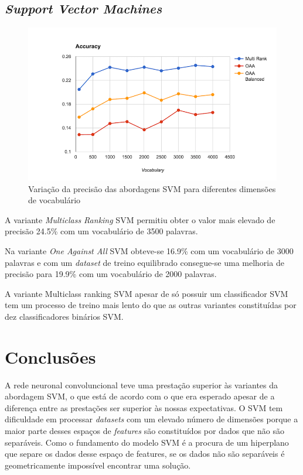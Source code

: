 \documentclass[extendedabs]{vcom}
\begin{document}
\subsection{\textit{Support Vector Machines}}

\begin{figure}[h]
\includegraphics[width=\linewidth]{images/svn_graph.png}
\caption{Variação da precisão das abordagens SVM para diferentes dimensões de vocabulário}
\label{fig:graph1}
\end{figure}

A variante \textit{Multiclass Ranking} SVM permitiu obter o valor mais elevado de precisão 24.5\% com um vocabulário de 3500 palavras. 

Na variante \textit{One Against All} SVM obteve-se 16.9\% com um vocabulário de 3000 palavras e com um \textit{dataset} de treino equilibrado consegue-se uma melhoria de precisão para 19.9\% com um vocabulário de 2000 palavras. 

A variante Multiclass ranking SVM apesar de só possuir um classificador SVM tem um processo de treino mais lento do que as outras variantes constituídas por dez classificadores binários SVM.

\section{Conclusões}
A rede neuronal convoluncional teve uma prestação superior às variantes da abordagem SVM, o que está de acordo com o que era esperado apesar de a diferença entre as prestações ser superior às nossas expectativas. O SVM tem dificuldade em processar \textit{datasets} com um elevado número de dimensões porque a maior parte desses espaços de \textit{features} são constituídos por dados que não são separáveis. Como o fundamento do modelo SVM é a procura de um hiperplano que separe os dados desse espaço de features, se os dados não são separáveis é geometricamente impossível encontrar uma solução. 
\end{document}

